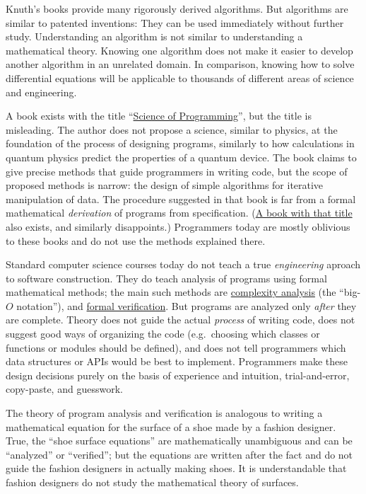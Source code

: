 Knuth's books provide many rigorously derived algorithms. But algorithms
are similar to patented inventions: They can be used immediately without
further study. Understanding an algorithm is not similar to understanding
a mathematical theory. Knowing one algorithm does not make it easier
to develop another algorithm in an unrelated domain. In comparison,
knowing how to solve differential equations will be applicable to
thousands of different areas of science and engineering.

A book exists with the title ``\href{https://www.amazon.com/Science-Programming-Monographs-Computer/dp/0387964800}{Science of Programming}'',
but the title is misleading. The author does not propose a science,
similar to physics, at the foundation of the process of designing
programs, similarly to how calculations in quantum physics predict
the properties of a quantum device. The book claims to give precise
methods that guide programmers in writing code, but the scope of proposed
methods is narrow: the design of simple algorithms for iterative manipulation
of data. The procedure suggested in that book is far from a formal
mathematical \emph{derivation} of programs from specification. (\href{https://www.amazon.com/Program-Derivation-Development-Specifications-International/dp/0201416247}{A book with that title}
also exists, and similarly disappoints.) Programmers today are mostly
oblivious to these books and do not use the methods explained there.

Standard computer science courses today do not teach a true \emph{engineering}
aproach to software construction. They do teach analysis of programs
using formal mathematical methods; the main such methods are \href{https://www.cs.cmu.edu/~adamchik/15-121/lectures/Algorithmic\%20Complexity/complexity.html}{complexity analysis}
(the ``big-$O$ notation''), and \href{https://en.wikipedia.org/wiki/Formal_verification}{formal verification}.
But programs are analyzed only \emph{after} they are complete. Theory
does not guide the actual \emph{process} of writing code, does not
suggest good ways of organizing the code (e.g.~choosing which classes
or functions or modules should be defined), and does not tell programmers
which data structures or APIs would be best to implement. Programmers
make these design decisions purely on the basis of experience and
intuition, trial-and-error, copy-paste, and guesswork. 

The theory of program analysis and verification is analogous to writing
a mathematical equation for the surface of a shoe made by a fashion
designer. True, the ``shoe surface equations'' are mathematically
unambiguous and can be ``analyzed'' or ``verified''; but the equations
are written after the fact and do not guide the fashion designers
in actually making shoes. It is understandable that fashion designers
do not study the mathematical theory of surfaces.

